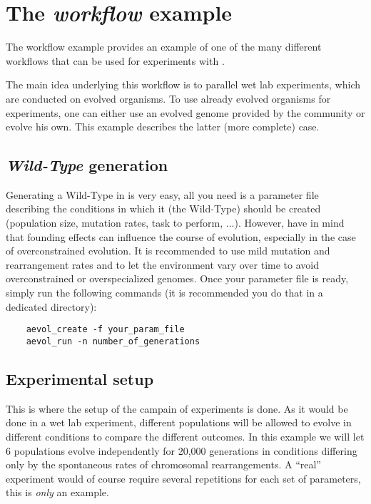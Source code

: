 \section{The \emph{workflow} example}
The workflow example provides an example of one of the many different workflows that can be used for experiments with \aevol{}.

The main idea underlying this workflow is to parallel wet lab experiments, which are conducted on evolved organisms.
To use already evolved organisms for \aevol{} experiments, one can either use an evolved genome provided by the community or evolve his own. This example describes the latter (more complete) case.


\subsection{\emph{Wild-Type} generation}
Generating a Wild-Type in \aevol{} is very easy, all you need is a parameter file describing the conditions in which it (the Wild-Type) should be created (population size, mutation rates, task to perform, ...).
However, have in mind that founding effects can influence the course of evolution, especially in the case of overconstrained evolution. It is recommended to use mild mutation and rearrangement rates and to let the environment vary over time to avoid overconstrained or overspecialized genomes.
Once your parameter file is ready, simply run the following commands (it is recommended you do that in a dedicated directory):

\begin{verbatim}
	aevol_create -f your_param_file
	aevol_run -n number_of_generations
\end{verbatim}



\subsection{Experimental setup}
This is where the setup of the campain of experiments is done.
As it would be done in a wet lab experiment, different populations will be allowed to evolve in different conditions to compare the different outcomes. In this example we will let 6 populations evolve independently for 20,000 generations in conditions differing only by the spontaneous rates of chromosomal rearrangements. A ``real'' experiment would of course require several repetitions for each set of parameters, this is \emph{only} an example.

